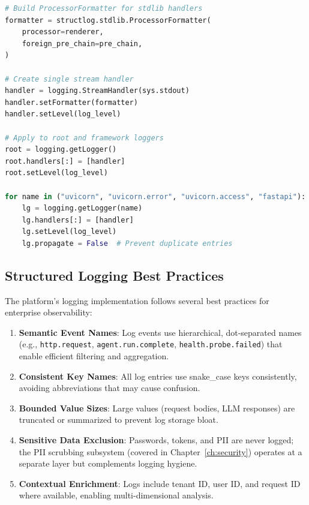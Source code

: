 \begin{lstlisting}[language=Python, caption={Logger unification}]
# Build ProcessorFormatter for stdlib handlers
formatter = structlog.stdlib.ProcessorFormatter(
    processor=renderer,
    foreign_pre_chain=pre_chain,
)

# Create single stream handler
handler = logging.StreamHandler(sys.stdout)
handler.setFormatter(formatter)
handler.setLevel(log_level)

# Apply to root and framework loggers
root = logging.getLogger()
root.handlers[:] = [handler]
root.setLevel(log_level)

for name in ("uvicorn", "uvicorn.error", "uvicorn.access", "fastapi"):
    lg = logging.getLogger(name)
    lg.handlers[:] = [handler]
    lg.setLevel(log_level)
    lg.propagate = False  # Prevent duplicate entries
\end{lstlisting}

\subsection{Structured Logging Best Practices}

The platform's logging implementation follows several best practices for enterprise observability:

\begin{enumerate}
    \item \textbf{Semantic Event Names}: Log events use hierarchical, dot-separated names (e.g., \texttt{http.request}, \texttt{agent.run.complete}, \texttt{health.probe.failed}) that enable efficient filtering and aggregation.
    
    \item \textbf{Consistent Key Names}: All log entries use snake\_case keys consistently, avoiding abbreviations that may cause confusion.
    
    \item \textbf{Bounded Value Sizes}: Large values (request bodies, LLM responses) are truncated or summarized to prevent log storage bloat.
    
    \item \textbf{Sensitive Data Exclusion}: Passwords, tokens, and PII are never logged; the PII scrubbing subsystem (covered in Chapter~\ref{ch:security}) operates at a separate layer but complements logging hygiene.
    
    \item \textbf{Contextual Enrichment}: Logs include tenant ID, user ID, and request ID where available, enabling multi-dimensional analysis.
\end{enumerate}

